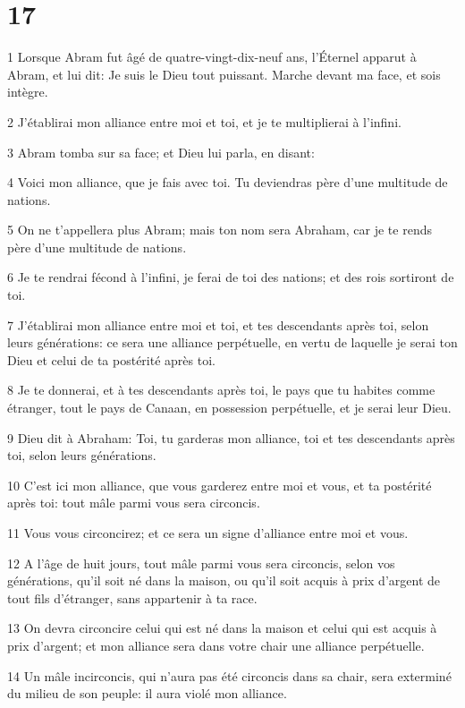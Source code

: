 \chapter{17}

\par 1 Lorsque Abram fut âgé de quatre-vingt-dix-neuf ans, l'Éternel apparut à Abram, et lui dit: Je suis le Dieu tout puissant. Marche devant ma face, et sois intègre.
\par 2 J'établirai mon alliance entre moi et toi, et je te multiplierai à l'infini.
\par 3 Abram tomba sur sa face; et Dieu lui parla, en disant:
\par 4 Voici mon alliance, que je fais avec toi. Tu deviendras père d'une multitude de nations.
\par 5 On ne t'appellera plus Abram; mais ton nom sera Abraham, car je te rends père d'une multitude de nations.
\par 6 Je te rendrai fécond à l'infini, je ferai de toi des nations; et des rois sortiront de toi.
\par 7 J'établirai mon alliance entre moi et toi, et tes descendants après toi, selon leurs générations: ce sera une alliance perpétuelle, en vertu de laquelle je serai ton Dieu et celui de ta postérité après toi.
\par 8 Je te donnerai, et à tes descendants après toi, le pays que tu habites comme étranger, tout le pays de Canaan, en possession perpétuelle, et je serai leur Dieu.
\par 9 Dieu dit à Abraham: Toi, tu garderas mon alliance, toi et tes descendants après toi, selon leurs générations.
\par 10 C'est ici mon alliance, que vous garderez entre moi et vous, et ta postérité après toi: tout mâle parmi vous sera circoncis.
\par 11 Vous vous circoncirez; et ce sera un signe d'alliance entre moi et vous.
\par 12 A l'âge de huit jours, tout mâle parmi vous sera circoncis, selon vos générations, qu'il soit né dans la maison, ou qu'il soit acquis à prix d'argent de tout fils d'étranger, sans appartenir à ta race.
\par 13 On devra circoncire celui qui est né dans la maison et celui qui est acquis à prix d'argent; et mon alliance sera dans votre chair une alliance perpétuelle.
\par 14 Un mâle incirconcis, qui n'aura pas été circoncis dans sa chair, sera exterminé du milieu de son peuple: il aura violé mon alliance.
